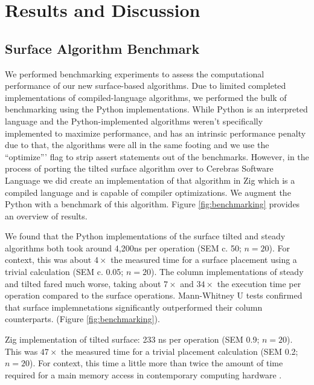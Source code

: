 \section{Results and Discussion} \label{sec:results}





\subsection{Surface Algorithm Benchmark}



We performed benchmarking experiments to assess the computational performance of our new surface-based algorithms.
Due to limited completed implementations of compiled-language algorithms, we performed the bulk of benchmarking using the Python implementations.
While Python is an interpreted language and the Python-implemented algorithms weren't specifically implemented to maximize performance, and has an intrinsic performance penalty due to that, the algorithms were all in the same footing and we use the ``optimize''' flag to strip assert statements out of the benchmarks.
However, in the process of porting the tilted surface algorithm over to Cerebras Software Language we did create an implementation of that algorithm in Zig which is a compiled language and is capable of compiler optimizations.
We augment the Python with a benchmark of this algorithm.
Figure \ref{fig:benchmarking} provides an overview of results.

We found that the Python implementations of the surface tilted and steady algorithms both took around 4,200ns per operation (SEM c. 50; $n=20$).
For context, this was about $4\times$ the measured time for a surface placement using a trivial calculation (SEM c. 0.05; $n=20$).
The column implementations of steady and tilted fared much worse, taking about $7\times$ and $34\times$ the execution time per operation compared to the surface operations.
Mann-Whitney U tests confirmed that surface implemnetations significantly outperformed their column counterparts. (Figure \ref{fig:benchmarking}).

Zig implementation of tilted surface:
233 ns per operation (SEM 0.9; $n=20$).
This was $47\times$ the measured time for a trivial placement calculation (SEM 0.2; $n=20$).
For context, this time a little more than twice the amount of time required for a main memory access in contemporary computing hardware \citep{markus2022memory}.

